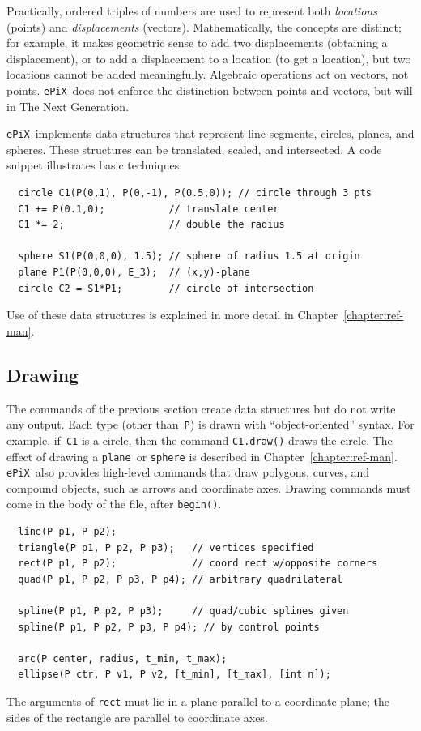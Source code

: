 \documentclass[12pt]{report}
\newcommand{\code}[1]{\texttt{#1}}
\newcommand{\ePiX}{\code{ePiX}}
\begin{document}
Practically, ordered triples of numbers are used to represent both
\emph{locations} (points) and \emph{displacements} (vectors).
Mathematically, the concepts are distinct; for example, it makes
geometric sense to add two displacements (obtaining a displacement),
or to add a displacement to a location (to get a location), but two
locations cannot be added meaningfully. Algebraic operations act on
vectors, not points. \ePiX\ does not enforce the distinction between
points and vectors, but will in The Next Generation.

\ePiX\ implements data structures that represent line segments,
circles, planes, and spheres. These structures can be translated,
scaled, and intersected. A code snippet illustrates basic techniques:
\begin{verbatim}
  circle C1(P(0,1), P(0,-1), P(0.5,0)); // circle through 3 pts
  C1 += P(0.1,0);           // translate center
  C1 *= 2;                  // double the radius

  sphere S1(P(0,0,0), 1.5); // sphere of radius 1.5 at origin
  plane P1(P(0,0,0), E_3);  // (x,y)-plane
  circle C2 = S1*P1;        // circle of intersection
\end{verbatim}
Use of these data structures is explained in more detail in
Chapter~\ref{chapter:ref-man}.


\subsection*{Drawing}

The commands of the previous section create data structures but do not
write any output. Each type (other than~\code{P}) is drawn with
``object-oriented'' syntax.  For example, if~\code{C1} is a circle,
then the command \code{C1.draw()} draws the circle. The effect of
drawing a \code{plane}~or \code{sphere} is described in
Chapter~\ref{chapter:ref-man}. \ePiX\ also provides high-level
commands that draw polygons, curves, and compound objects, such as
arrows and coordinate axes.  Drawing commands must come
in the body of the file, after \code{begin()}.

\begin{verbatim}
  line(P p1, P p2);
  triangle(P p1, P p2, P p3);   // vertices specified
  rect(P p1, P p2);             // coord rect w/opposite corners
  quad(P p1, P p2, P p3, P p4); // arbitrary quadrilateral

  spline(P p1, P p2, P p3);     // quad/cubic splines given 
  spline(P p1, P p2, P p3, P p4); // by control points

  arc(P center, radius, t_min, t_max);
  ellipse(P ctr, P v1, P v2, [t_min], [t_max], [int n]);
\end{verbatim}
The arguments of \code{rect} must lie in a plane
parallel to a coordinate plane; the sides of the rectangle are
parallel to coordinate axes.
\end{document}

